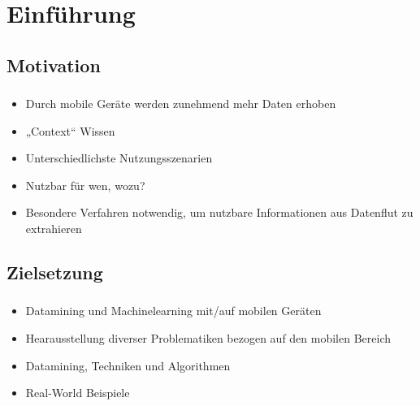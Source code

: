 \section{Einführung}


\subsection{Motivation}

\begin{frame}
    \frametitle{\insertsubsection} 
    \begin{itemize}
        \setlength\itemsep{1em}
        \item Durch mobile Geräte werden zunehmend mehr Daten erhoben
        \item „Context“ Wissen
        \item Unterschiedlichste Nutzungsszenarien
        \item Nutzbar für wen, wozu?
        \item Besondere Verfahren notwendig, um nutzbare Informationen aus Datenflut zu extrahieren
    \end{itemize}
\end{frame}


\subsection{Zielsetzung}

\begin{frame}
    \frametitle{\insertsubsection} 
    \begin{itemize}
        \setlength\itemsep{1em}
        \item Datamining und Machinelearning mit/auf mobilen Geräten
        \item Hearausstellung diverser Problematiken bezogen auf den mobilen Bereich
        \item Datamining, Techniken und Algorithmen
        \item Real-World Beispiele
    \end{itemize}
\end{frame}
